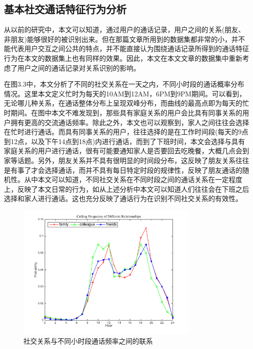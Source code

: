 \subsection{基本社交通话特征行为分析}

从以前的研究中，本文可以知道，通过用户的通话记录，用户之间的关系(朋友、非朋友)能够很好的被识别出来。但在那篇文章所用到的数据集都非常的小，并不能代表用户交互之间公共的特点，并不能直接认为围绕通话记录所得到的通话特征行为在本文的数据集上也有同样的效果。因此，本文在本文文章的数据集中重新考虑了用户之间的通话记录对关系识别的影响。

在图3.3中，本文分析了不同的社交关系在一天之内，不同小时段的通话概率分布情况。这里本文定义忙时为每天的10AM到12AM，6PM到9PM期间。可以看到，无论哪儿种关系，在通话整体分布上呈现双峰分布，而曲线的最高点即为每天的忙时期间。在图中本文不难发现到，那些具有家庭关系的用户会比具有同事关系的用户拥有更高的交流通话频率。除此之外，本文也可以观察到，家人之间往往会选择在忙时进行通话。而具有同事关系的用户，往往选择的是在工作时间段(每天的9点到12点，以及下午14点到18点)内进行通话，而到了下班时间，本文会选择与具有家庭关系的用户进行通话，很有可能要通知家人是否要回去吃晚餐，大概几点会到家等话题。另外，朋友关系并不具有很明显的时间段分布，这反映了朋友关系往往是有事了才会选择通话，而并不具有每日特定时段的规律性，反映了朋友通话的随机性。从中本文可以知道，不同社交关系在不同时段之间的通话关系在一定程度上，反映了本文日常的行为，如从上述分析中本文可以知道人们往往会在下班之后选择和家人进行通话。这也充分反映了通话行为在识别不同社交关系的有效性。



\begin{figure}[ht]
    \centering
    \includegraphics[scale=1,width=0.8\textwidth]{figure/callFrequencyDistribution.png}
    \caption{社交关系与不同小时段通话频率之间的联系}
    \label{fig-callFrequency}
\end{figure}

